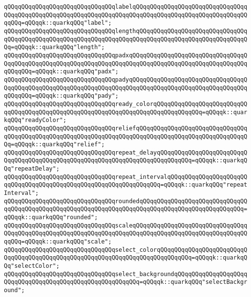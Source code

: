 \verb|qQQqqQQqqQQqqQQqqQQqqQQqqQQqqQQqlabelqQQqqQQqqQQqqQQqqQQqqQQqqQQqqQQqqQQqqQQqqQQqqQQqqQQqqQQqqQQqqQQqqQQqqQQqqQQqqQQqqQQqqQQqqQQqqQQqqQQqqQQqqQQq=qQQqqk::quarkqQQq"label";|\newline
\verb|qQQqqQQqqQQqqQQqqQQqqQQqqQQqqQQqlengthqQQqqQQqqQQqqQQqqQQqqQQqqQQqqQQqqQQqqQQqqQQqqQQqqQQqqQQqqQQqqQQqqQQqqQQqqQQqqQQqqQQqqQQqqQQqqQQqqQQqqQQq=qQQqqk::quarkqQQq"length";|\newline
\verb|qQQqqQQqqQQqqQQqqQQqqQQqqQQqqQQqpadxqQQqqQQqqQQqqQQqqQQqqQQqqQQqqQQqqQQqqQQqqQQqqQQqqQQqqQQqqQQqqQQqqQQqqQQqqQQqqQQqqQQqqQQqqQQqqQQqqQQqqQQqqQQqqQQq=qQQqqk::quarkqQQq"padx";|\newline
\verb|qQQqqQQqqQQqqQQqqQQqqQQqqQQqqQQqpadyqQQqqQQqqQQqqQQqqQQqqQQqqQQqqQQqqQQqqQQqqQQqqQQqqQQqqQQqqQQqqQQqqQQqqQQqqQQqqQQqqQQqqQQqqQQqqQQqqQQqqQQqqQQqqQQq=qQQqqk::quarkqQQq"pady";|\newline
\verb|qQQqqQQqqQQqqQQqqQQqqQQqqQQqqQQqready_colorqQQqqQQqqQQqqQQqqQQqqQQqqQQqqQQqqQQqqQQqqQQqqQQqqQQqqQQqqQQqqQQqqQQqqQQqqQQqqQQqqQQq=qQQqqk::quarkqQQq"readyColor";|\newline
\verb|qQQqqQQqqQQqqQQqqQQqqQQqqQQqqQQqreliefqQQqqQQqqQQqqQQqqQQqqQQqqQQqqQQqqQQqqQQqqQQqqQQqqQQqqQQqqQQqqQQqqQQqqQQqqQQqqQQqqQQqqQQqqQQqqQQqqQQqqQQq=qQQqqk::quarkqQQq"relief";|\newline
\verb|qQQqqQQqqQQqqQQqqQQqqQQqqQQqqQQqrepeat_delayqQQqqQQqqQQqqQQqqQQqqQQqqQQqqQQqqQQqqQQqqQQqqQQqqQQqqQQqqQQqqQQqqQQqqQQqqQQqqQQq=qQQqqk::quarkqQQq"repeatDelay";|\newline
\verb|qQQqqQQqqQQqqQQqqQQqqQQqqQQqqQQqrepeat_intervalqQQqqQQqqQQqqQQqqQQqqQQqqQQqqQQqqQQqqQQqqQQqqQQqqQQqqQQqqQQqqQQqqQQq=qQQqqk::quarkqQQq"repeatInterval";|\newline
\verb|qQQqqQQqqQQqqQQqqQQqqQQqqQQqqQQqroundedqQQqqQQqqQQqqQQqqQQqqQQqqQQqqQQqqQQqqQQqqQQqqQQqqQQqqQQqqQQqqQQqqQQqqQQqqQQqqQQqqQQqqQQqqQQqqQQqqQQq=qQQqqk::quarkqQQq"rounded";|\newline
\verb|qQQqqQQqqQQqqQQqqQQqqQQqqQQqqQQqscaleqQQqqQQqqQQqqQQqqQQqqQQqqQQqqQQqqQQqqQQqqQQqqQQqqQQqqQQqqQQqqQQqqQQqqQQqqQQqqQQqqQQqqQQqqQQqqQQqqQQqqQQqqQQq=qQQqqk::quarkqQQq"scale";|\newline
\verb|qQQqqQQqqQQqqQQqqQQqqQQqqQQqqQQqselect_colorqQQqqQQqqQQqqQQqqQQqqQQqqQQqqQQqqQQqqQQqqQQqqQQqqQQqqQQqqQQqqQQqqQQqqQQqqQQqqQQq=qQQqqk::quarkqQQq"selectColor";|\newline
\verb|qQQqqQQqqQQqqQQqqQQqqQQqqQQqqQQqselect_backgroundqQQqqQQqqQQqqQQqqQQqqQQqqQQqqQQqqQQqqQQqqQQqqQQqqQQqqQQqqQQq=qQQqqk::quarkqQQq"selectBackground";|\newline
